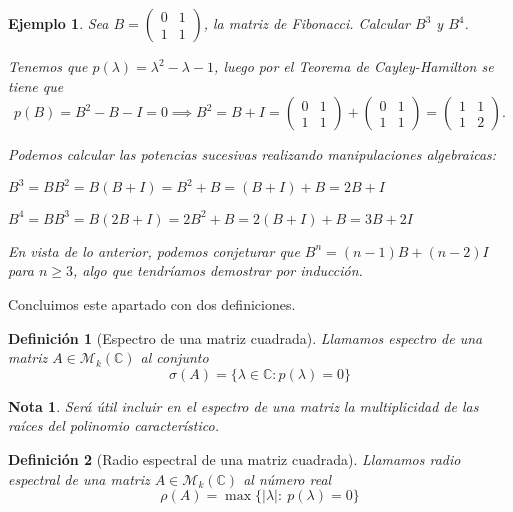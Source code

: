 \documentclass[11pt, a4paper]{article}
\newif\IfInSansMode
\numberwithin{equation}{section}
\theoremstyle{theorem-style}
\theoremstyle{definition-style}
\newtheorem{ndef}{Definición}[section]
\theoremstyle{remark-style}
\newtheorem*{nota}{Nota}
\theoremstyle{example-style}
\newtheorem{ejemplo}{Ejemplo}[section]
\begin{document}
\begin{ejemplo}
  Sea $B =
  \begin{pmatrix}
    0 & 1 \\
    1 & 1
  \end{pmatrix}$, la matriz de Fibonacci. Calcular $B^3$ y $B^4$.

Tenemos que $p(\lambda) = \lambda^2 - \lambda -1$, luego por el \textit{Teorema de Cayley-Hamilton} se tiene que $$p(B) = B^2 - B - I = 0 \implies B^2 = B + I = 
\begin{pmatrix}
  0 & 1 \\
  1 & 1
\end{pmatrix} +
\begin{pmatrix}
  0 & 1 \\
  1 & 1
\end{pmatrix} =
\begin{pmatrix}
  1 & 1 \\
  1 & 2
\end{pmatrix}.$$

Podemos calcular las potencias sucesivas realizando manipulaciones algebraicas:

$B^3 = BB^2 = B(B+I) = B^2 + B = (B+I) + B = 2B + I$

$B^4 = BB^3 = B(2B + I) = 2B^2 + B = 2(B+I) + B = 3B + 2I$

En vista de lo anterior, podemos conjeturar que $B^n = (n-1)B + (n-2)I$ para $n
\geq 3$, algo que tendríamos demostrar por inducción.

\end{ejemplo}

Concluimos este apartado con dos definiciones.

\begin{ndef}[Espectro de una matriz cuadrada]
  Llamamos espectro de una matriz $A \in \mathcal M_k(\mathbb C)$ al conjunto $$\sigma(A) = \{ \lambda \in
  \mathbb C : p(\lambda) = 0 \}$$
\end{ndef}

\begin{nota}
	Será útil incluir en el espectro de una matriz la multiplicidad de las raíces del polinomio característico.
\end{nota}

\begin{ndef}[Radio espectral de una matriz cuadrada]
  Llamamos radio espectral de una matriz $A \in \mathcal M_k(\mathbb C)$ al número real $$\rho(A) =\max \{|\lambda| :\
  p(\lambda) = 0 \}$$
\end{ndef}
\end{document}
